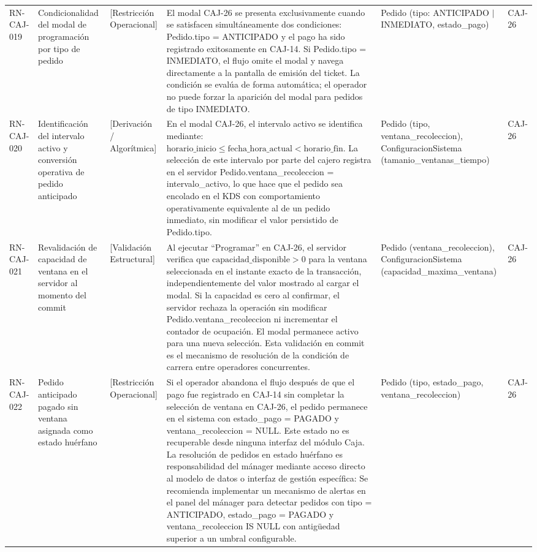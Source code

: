 \begin{landscape}
\begin{longtable}[c]{l p{2.1cm} p{2.1cm} p{8cm} p{4cm} p{3cm}}
RN-CAJ-019 & Condicionalidad del modal de programación por tipo de pedido & [Restricción Operacional] & El modal CAJ-26 se presenta exclusivamente cuando se satisfacen simultáneamente dos condiciones: Pedido.tipo = ANTICIPADO y el pago ha sido registrado exitosamente en CAJ-14. Si Pedido.tipo = INMEDIATO, el flujo omite el modal y navega directamente a la pantalla de emisión del ticket. La condición se evalúa de forma automática; el operador no puede forzar la aparición del modal para pedidos de tipo INMEDIATO. & Pedido (tipo: ANTICIPADO $|$ INMEDIATO, estado\_pago) & CAJ-26 \\
\addlinespace
RN-CAJ-020 & Identificación del intervalo activo y conversión operativa de pedido anticipado & [Derivación / Algorítmica] & En el modal CAJ-26, el intervalo activo se identifica mediante: $\text{horario\_inicio} \le \text{fecha\_hora\_actual} < \text{horario\_fin}$. La selección de este intervalo por parte del cajero registra en el servidor Pedido.ventana\_recoleccion = intervalo\_activo, lo que hace que el pedido sea encolado en el KDS con comportamiento operativamente equivalente al de un pedido inmediato, sin modificar el valor persistido de Pedido.tipo. & Pedido (tipo, ventana\_recoleccion), ConfiguracionSistema (tamanio\_ventanas\_tiempo) & CAJ-26 \\
\addlinespace
RN-CAJ-021 & Revalidación de capacidad de ventana en el servidor al momento del commit & [Validación Estructural] & Al ejecutar ``Programar'' en CAJ-26, el servidor verifica que $\text{capacidad\_disponible} > 0$ para la ventana seleccionada en el instante exacto de la transacción, independientemente del valor mostrado al cargar el modal. Si la capacidad es cero al confirmar, el servidor rechaza la operación sin modificar Pedido.ventana\_recoleccion ni incrementar el contador de ocupación. El modal permanece activo para una nueva selección. Esta validación en commit es el mecanismo de resolución de la condición de carrera entre operadores concurrentes. & Pedido (ventana\_recoleccion), ConfiguracionSistema (capacidad\_maxima\_ventana) & CAJ-26 \\
\addlinespace
RN-CAJ-022 & Pedido anticipado pagado sin ventana asignada como estado huérfano & [Restricción Operacional] & Si el operador abandona el flujo después de que el pago fue registrado en CAJ-14 sin completar la selección de ventana en CAJ-26, el pedido permanece en el sistema con estado\_pago = PAGADO y ventana\_recoleccion = NULL. Este estado no es recuperable desde ninguna interfaz del módulo Caja. La resolución de pedidos en estado huérfano es responsabilidad del mánager mediante acceso directo al modelo de datos o interfaz de gestión específica: Se recomienda implementar un mecanismo de alertas en el panel del mánager para detectar pedidos con tipo = ANTICIPADO, estado\_pago = PAGADO y ventana\_recoleccion IS NULL con antigüedad superior a un umbral configurable. & Pedido (tipo, estado\_pago, ventana\_recoleccion) & CAJ-26 \\
\end{longtable}
\endgroup


\end{landscape}
